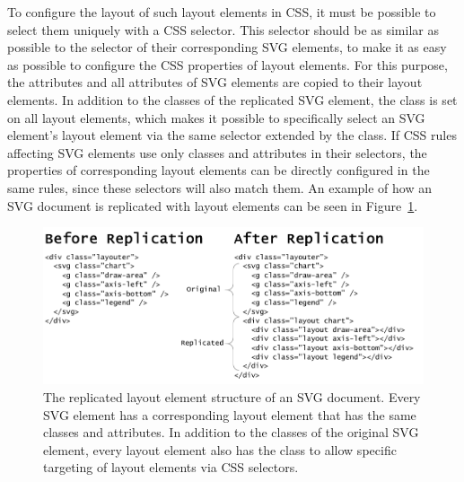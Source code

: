 To configure the layout of such layout elements in CSS, it must be
possible to select them uniquely with a CSS selector. This selector
should be as similar as possible to the selector of their
corresponding SVG elements, to make it as easy as possible to
configure the CSS properties of layout elements. For this purpose, the
 attributes and all  attributes of SVG
elements are copied to their layout elements. In addition to the
classes of the replicated SVG element, the  class is set
on all layout elements, which makes it possible to specifically select
an SVG element's layout element via the same selector extended by the
 class. If CSS rules affecting SVG elements use only
classes and  attributes in their selectors, the
properties of corresponding layout elements can be directly configured
in the same rules, since these selectors will also match them. An
example of how an SVG document is replicated with 
layout elements can be seen in Figure~\ref{fig:LayouterReplication}.

\begin{figure}[tp]
\centering
\includegraphics[keepaspectratio,width=\linewidth,height=\fullh]
{diagrams/respvis-layouter-replication.pdf}
\caption[Replication of an SVG Document via Layouter]{%
The replicated layout element structure of an SVG document. Every SVG
element has a corresponding layout element that has the same classes
and  attributes. In addition to the classes of the
original SVG element, every layout element also has the 
class to allow specific targeting of layout elements via CSS
selectors.  }
\label{fig:LayouterReplication}
\end{figure}


